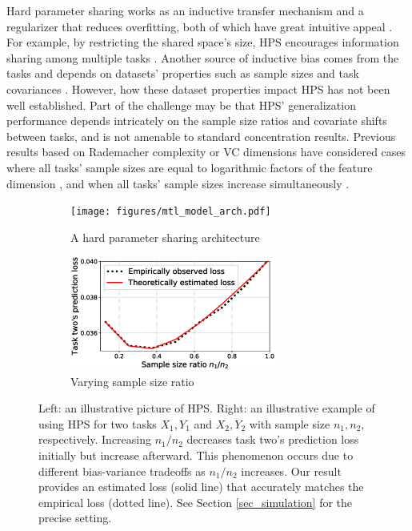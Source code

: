Hard parameter sharing works as an inductive transfer mechanism and a regularizer that reduces overfitting, both of which have great intuitive appeal \cite{R17}.
For example, by restricting the shared space's size, HPS encourages information sharing among multiple tasks \cite{KD12}.
Another source of inductive bias comes from the tasks and depends on datasets' properties such as sample sizes and task covariances \cite{WZR20}.
However, how these dataset properties impact HPS has not been well established.
Part of the challenge may be that HPS' generalization performance depends intricately on the sample size ratios and covariate shifts between tasks, and is not amenable to standard concentration results.
Previous results based on Rademacher complexity or VC dimensions have considered cases where all tasks' sample sizes are equal to logarithmic factors of the feature dimension \cite{B00,MPR16}, and when all tasks' sample sizes increase simultaneously \cite{AZ05,M06}.

\begin{figure}[!t]
	\begin{subfigure}[t]{0.5\textwidth}
		\centering
		\texttt{[image: figures/mtl\_model\_arch.pdf]}
		\caption{A hard parameter sharing architecture}
		\label{fig_intro_arch}
	\end{subfigure}\hfill
	\begin{subfigure}[t]{0.5\textwidth}
		\centering
		\includegraphics[width=0.745\textwidth,valign=t]{figures/sample_ratio_c2_400.eps}
		\caption{Varying sample size ratio}
		\label{fig_intro_sample_size_b}
	\end{subfigure}
	\vspace{-0.1in}
	\caption{
	Left: an illustrative picture of HPS.
	Right: an illustrative example of using HPS for two tasks $X_1, Y_1$ and $X_2, Y_2$ with sample size $n_1, n_2$, respectively.
	Increasing $n_1/n_2$ decreases task two's prediction loss initially but increase afterward. This phenomenon occurs due to different bias-variance tradeoffs as $n_1/n_2$ increases. Our result provides an estimated loss (solid line) that accurately matches the empirical loss (dotted line).
	See Section \ref{sec_simulation} for the precise setting.}
	\label{fig_intro_sample_size}
\end{figure}



